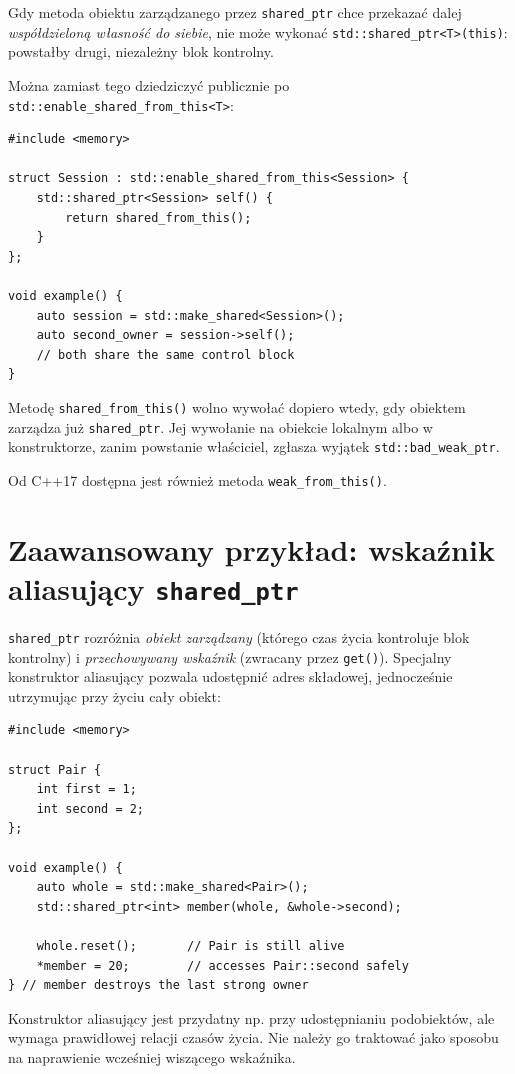 Gdy metoda obiektu zarządzanego przez \texttt{shared\_ptr}
chce przekazać dalej \emph{współdzieloną własność do siebie},
nie może wykonać \texttt{std::shared\_ptr<T>(this)}:
powstałby drugi, niezależny blok kontrolny.

Można zamiast tego dziedziczyć publicznie po
\texttt{std::enable\_shared\_from\_this<T>}:

\begin{lstlisting}
#include <memory>

struct Session : std::enable_shared_from_this<Session> {
    std::shared_ptr<Session> self() {
        return shared_from_this();
    }
};

void example() {
    auto session = std::make_shared<Session>();
    auto second_owner = session->self();
    // both share the same control block
}
\end{lstlisting}

Metodę \texttt{shared\_from\_this()} wolno wywołać dopiero wtedy,
gdy obiektem zarządza już \texttt{shared\_ptr}. Jej wywołanie
na obiekcie lokalnym albo w konstruktorze, zanim powstanie
właściciel, zgłasza wyjątek \texttt{std::bad\_weak\_ptr}.

Od C++17 dostępna jest również metoda \texttt{weak\_from\_this()}.

\section{Zaawansowany przykład: wskaźnik aliasujący \texttt{shared\_ptr}}

\texttt{shared\_ptr} rozróżnia \emph{obiekt zarządzany} (którego
czas życia kontroluje blok kontrolny) i \emph{przechowywany
wskaźnik} (zwracany przez \texttt{get()}). Specjalny konstruktor
aliasujący pozwala udostępnić adres składowej, jednocześnie
utrzymując przy życiu cały obiekt:

\begin{lstlisting}
#include <memory>

struct Pair {
    int first = 1;
    int second = 2;
};

void example() {
    auto whole = std::make_shared<Pair>();
    std::shared_ptr<int> member(whole, &whole->second);

    whole.reset();       // Pair is still alive
    *member = 20;        // accesses Pair::second safely
} // member destroys the last strong owner
\end{lstlisting}

Konstruktor aliasujący jest przydatny np. przy udostępnianiu
podobiektów, ale wymaga prawidłowej relacji czasów życia.
Nie należy go traktować jako sposobu na naprawienie
wcześniej wiszącego wskaźnika.

